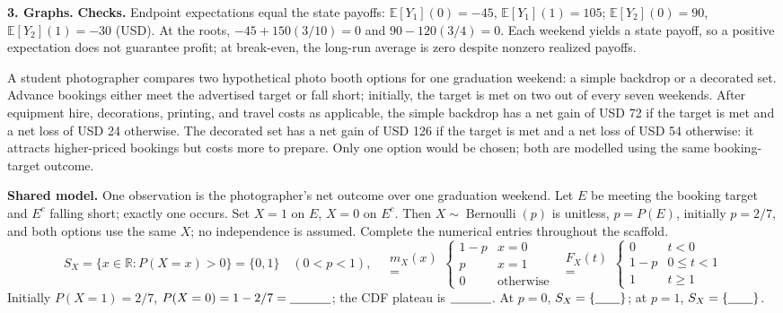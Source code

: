 \textbf{3. Graphs.}
\textbf{Checks.} Endpoint expectations equal the state payoffs:
$\mathbb E[Y_1](0)=-45$, $\mathbb E[Y_1](1)=105$;
$\mathbb E[Y_2](0)=90$, $\mathbb E[Y_2](1)=-30$ (USD).
At the roots, $-45+150(3/10)=0$ and $90-120(3/4)=0$.
Each weekend yields a state payoff, so a positive expectation does not guarantee profit;
at break-even, the long-run average is zero despite nonzero realized payoffs.

\vspace{-6mm}
A student photographer compares two hypothetical photo booth options for one graduation
weekend: a simple backdrop or a decorated set. Advance bookings either meet the advertised
target or fall short; initially, the target is met on two out of every seven weekends.
After equipment hire, decorations, printing, and travel costs as applicable, the simple
backdrop has a net gain of USD 72 if the target is met and a net loss of USD 24 otherwise.
The decorated set has a net gain of USD 126 if the target is met and a net loss of USD 54
otherwise: it attracts higher-priced bookings but costs more to prepare. Only one option
would be chosen; both are modelled using the same booking-target outcome.

\textbf{Shared model.} One observation is the photographer's net outcome over one graduation weekend.
Let $E$ be meeting the booking target and $E^c$ falling short; exactly one occurs.
Set $X=1$ on $E$, $X=0$ on $E^c$. Then $X\sim\operatorname{Bernoulli}(p)$ is unitless,
$p=P(E)$, initially $p=2/7$, and both options use the same $X$; no independence is assumed.
Complete the numerical entries throughout the scaffold.
\[
S_X=\{x\in\mathbb R:P(X=x)>0\}=\{0,1\}\quad(0<p<1),\quad
\begin{gathered}
m_X(x)\\
=
\end{gathered}
\begin{cases}1-p&x=0\\p&x=1\\0&\text{otherwise}\end{cases}
\enspace
\begin{gathered}
F_X(t)\\
=
\end{gathered}
\begin{cases}0&t<0\\1-p&0\leq t<1\\1&t\geq1\end{cases}
\]
Initially $P(X=1)=2/7$, $P(X=0)=1-2/7=\underline{\hspace{1.15cm}}$;
the CDF plateau is $\underline{\hspace{1.15cm}}$.
At $p=0$, $S_X=\{\underline{\hspace{.7cm}}\}$; at $p=1$, $S_X=\{\underline{\hspace{.7cm}}\}$.

